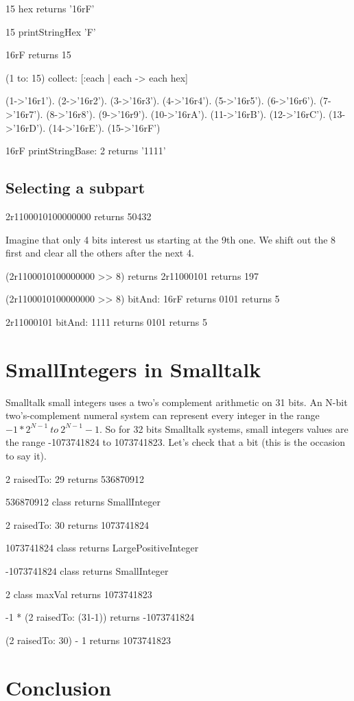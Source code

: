 \documentclass[a4paper,10pt,twoside]{book}
\begin{document}
\begin{code}
15 hex
	returns '16rF'
	
15 printStringHex 'F'

16rF
	returns 15
\end{code}


\begin{code}
(1 to: 15) collect: [:each | each -> each hex] 

{(1->'16r1'). (2->'16r2'). (3->'16r3'). (4->'16r4'). (5->'16r5'). (6->'16r6'). (7->'16r7'). (8->'16r8'). (9->'16r9'). (10->'16rA'). (11->'16rB'). (12->'16rC'). (13->'16rD'). (14->'16rE'). (15->'16rF')}
\end{code}


\begin{code}{}
16rF printStringBase: 2
	returns '1111'
\end{code}


\subsection*{Selecting a subpart}

\begin{code}{}
2r1100010100000000 
	returns 50432
\end{code}

Imagine that only 4 bits interest us starting at the 9th one.
We shift out the 8 first and clear all the others after the next 4.  

\begin{code}{}
(2r1100010100000000 >> 8)
	returns 2r11000101
	returns 197

(2r1100010100000000 >> 8) bitAnd: 16rF	
	returns 0101	
	returns 5
	
2r11000101 bitAnd: 1111
	returns 0101	
	returns 5
\end{code}


\section{SmallIntegers in Smalltalk}

Smalltalk small integers uses a two's complement arithmetic on 31 bits.  
An N-bit two's-complement numeral system can represent every integer in the range $-1 * 2^{N-1}\ to\ 2^{N-1}-1$. So for 32 bits Smalltalk systems, small integers values are the range -1073741824 to  1073741823. Let's check that a bit (this is the occasion to say it). 


\begin{code}{}
2 raisedTo: 29 
	returns 536870912 

536870912 class
	returns SmallInteger

2 raisedTo: 30 
	returns 1073741824

1073741824 class
	returns LargePositiveInteger

-1073741824 class 
	returns SmallInteger

2 class maxVal 
	returns 1073741823

-1 * (2 raisedTo: (31-1)) 
	returns -1073741824
	
(2 raisedTo: 30) - 1
	returns 1073741823
\end{code}


\section{Conclusion}

\ifx\wholebook\relax\else
   
   
\end{document}
